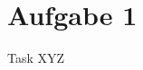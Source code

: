 
\section{Aufgabe 1}

\setcounter{exercise}{1}

\begin{frame}[allowframebreaks]{Task \thesection}{XYZ}
  \begin{requirementsnoinc}
    
  \end{requirementsnoinc}
  \begin{exercisenoinc}
    
  \end{exercisenoinc}
  \begin{solutionnoinc}
    
  \end{solutionnoinc}
\end{frame}
